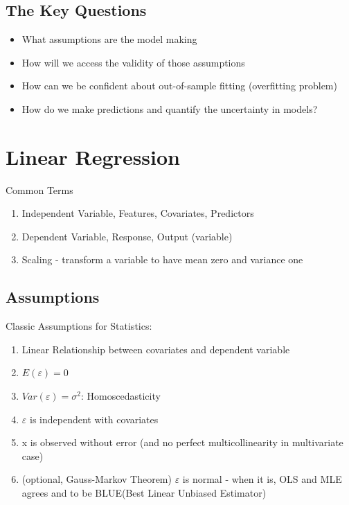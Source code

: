 \documentclass[11pt, openany]{book}              %
\begin{document}
\subsection{The Key Questions}

 \begin{itemize}
 	\item What assumptions are the model making
 	\item How will we access the validity of those assumptions
 	\item How can we be confident about out-of-sample fitting (overfitting problem)
 	\item How do we make predictions and quantify the uncertainty in models?
 \end{itemize}

\section{Linear Regression}

Common Terms

\begin{enumerate}
    \item Independent Variable, Features, Covariates, Predictors
    \item Dependent Variable, Response, Output (variable)
    \item Scaling - transform a variable to have mean zero and variance one
\end{enumerate}

\subsection{Assumptions}

Classic Assumptions for Statistics:
\begin{enumerate}
    \item Linear Relationship between covariates and dependent variable
    \item $E(\varepsilon)=0$
    \item $Var(\varepsilon) =\sigma^2$: Homoscedasticity
    \item $\varepsilon$ is independent with covariates 
    \item x is observed without error (and no perfect multicollinearity in multivariate case)
    \item (optional, Gauss-Markov Theorem) $\varepsilon$ is normal - when it is, OLS and MLE agrees and to be BLUE(Best Linear Unbiased Estimator)
\end{enumerate}
\end{document}
